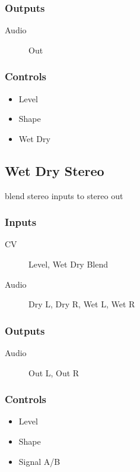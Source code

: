 \subsubsection{Outputs}
\begin{description}
\item [Audio] Out
\end{description}

\subsubsection{Controls}
\begin{itemize}
\item Level
\item Shape
\item Wet Dry
\end{itemize}

\subsection{Wet Dry Stereo}

blend stereo inputs to stereo out



\subsubsection{Inputs}
\begin{description}
\item [CV] Level, Wet Dry Blend
\item [Audio] Dry L, Dry R, Wet L, Wet R
\end{description}

\subsubsection{Outputs}
\begin{description}
\item [Audio] Out L, Out R
\end{description}

\subsubsection{Controls}
\begin{itemize}
\item Level
\item Shape
\item Signal A/B
\end{itemize}

